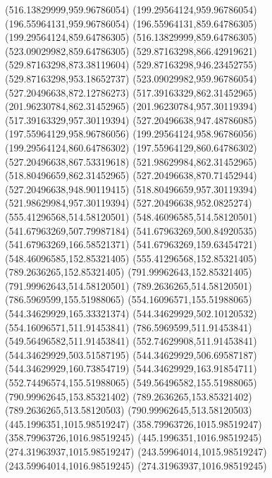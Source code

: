{{	\closepath
	\moveto(516.13829999,959.96786054)
	\lineto(199.29564124,959.96786054)
	\lineto(196.55964131,959.96786054)
	\lineto(196.55964131,859.64786305)
	\lineto(199.29564124,859.64786305)
	\lineto(516.13829999,859.64786305)
	\lineto(523.09029982,859.64786305)
	\lineto(529.87163298,866.42919621)
	\lineto(529.87163298,873.38119604)
	\lineto(529.87163298,946.23452755)
	\lineto(529.87163298,953.18652737)
	\lineto(523.09029982,959.96786054)
	\closepath
	\moveto(527.20496638,872.12786273)
	\lineto(517.39163329,862.31452965)
	\lineto(201.96230784,862.31452965)
	\lineto(201.96230784,957.30119394)
	\lineto(517.39163329,957.30119394)
	\lineto(527.20496638,947.48786085)
	\closepath
	\moveto(197.55964129,958.96786056)
	\lineto(199.29564124,958.96786056)
	\lineto(199.29564124,860.64786302)
	\lineto(197.55964129,860.64786302)
	\closepath
	\moveto(527.20496638,867.53319618)
	\lineto(521.98629984,862.31452965)
	\lineto(518.80496659,862.31452965)
	\lineto(527.20496638,870.71452944)
	\closepath
	\moveto(527.20496638,948.90119415)
	\lineto(518.80496659,957.30119394)
	\lineto(521.98629984,957.30119394)
	\lineto(527.20496638,952.0825274)
	\closepath
	\moveto(555.41296568,514.58120501)
	\lineto(548.46096585,514.58120501)
	\lineto(541.67963269,507.79987184)
	\lineto(541.67963269,500.84920535)
	\lineto(541.67963269,166.58521371)
	\lineto(541.67963269,159.63454721)
	\lineto(548.46096585,152.85321405)
	\lineto(555.41296568,152.85321405)
	\lineto(789.2636265,152.85321405)
	\lineto(791.99962643,152.85321405)
	\lineto(791.99962643,514.58120501)
	\lineto(789.2636265,514.58120501)
	\closepath
	\moveto(786.5969599,155.51988065)
	\lineto(554.16096571,155.51988065)
	\lineto(544.34629929,165.33321374)
	\lineto(544.34629929,502.10120532)
	\lineto(554.16096571,511.91453841)
	\lineto(786.5969599,511.91453841)
	\closepath
	\moveto(549.56496582,511.91453841)
	\lineto(552.74629908,511.91453841)
	\lineto(544.34629929,503.51587195)
	\lineto(544.34629929,506.69587187)
	\closepath
	\moveto(544.34629929,160.73854719)
	\lineto(544.34629929,163.91854711)
	\lineto(552.74496574,155.51988065)
	\lineto(549.56496582,155.51988065)
	\closepath
	\moveto(790.99962645,153.85321402)
	\lineto(789.2636265,153.85321402)
	\lineto(789.2636265,513.58120503)
	\lineto(790.99962645,513.58120503)
	\closepath
	\moveto(445.1996351,1015.98519247)
	\lineto(358.79963726,1015.98519247)
	\lineto(358.79963726,1016.98519245)
	\lineto(445.1996351,1016.98519245)
	\closepath
	\moveto(274.31963937,1015.98519247)
	\lineto(243.59964014,1015.98519247)
	\lineto(243.59964014,1016.98519245)
	\lineto(274.31963937,1016.98519245)
	\closepath
}}
